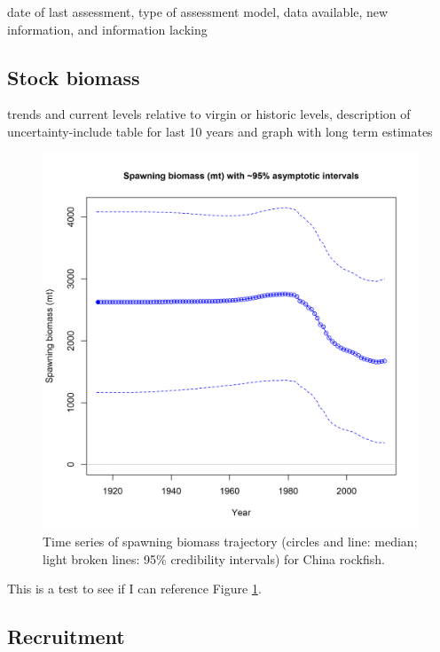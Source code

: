 \documentclass[12pt,]{article}
\begin{document}
date of last assessment, type of assessment model, data available, new
information, and information lacking

\subsection*{Stock biomass}\label{stock-biomass}

trends and current levels relative to virgin or historic levels,
description of uncertainty-include table for last 10 years and graph
with long term estimates

\begin{figure}[htbp]
\centering
\includegraphics{plots/spawningB.png}
\caption{Time series of spawning biomass trajectory (circles and line:
median; light broken lines: 95\% credibility intervals) for China
rockfish. \label{spawningB}}
\end{figure}

This is a test to see if I can reference Figure \ref{spawningB}.

\subsection*{Recruitment}\label{recruitment}
\end{document}
